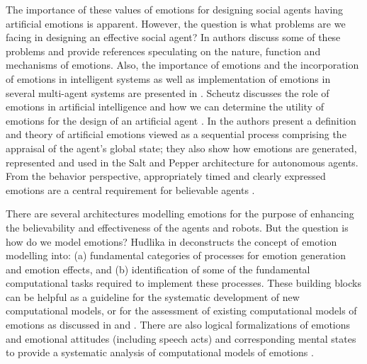 \documentclass[12pt]{report}
\begin{document}
The importance of these values of emotions for designing social agents having
artificial emotions is apparent. However, the question is what problems are we
facing in designing an effective social agent? In
\cite{freitas:artificial-emotions-ready} authors discuss some of these problems
and provide references speculating on the nature, function and mechanisms of
emotions. Also, the importance of emotions and the incorporation of emotions in
intelligent systems as well as implementation of emotions in several multi-agent
systems are presented in \cite{miranda:emotions-humans-ai}. Scheutz discusses
the role of emotions in artificial intelligence and how we can determine the
utility of emotions for the design of an artificial agent
\cite{scheutz:emotion-role}. In \cite{botelho:machinery-emotions} the authors
present a definition and theory of artificial emotions viewed as a sequential
process comprising the appraisal of the agent's global state; they also show how
emotions are generated, represented and used in the Salt and Pepper architecture
for autonomous agents. From the behavior perspective, appropriately timed and
clearly expressed emotions are a central requirement for believable agents
\cite{bates:emotion-roles}.

There are several architectures modelling emotions for the purpose of enhancing
the believability and effectiveness of the agents and robots. But the question
is how do we model emotions? Hudlika in \cite{hudlicka:modeling-emotion}
deconstructs the concept of emotion modelling into: (a) fundamental categories
of processes for emotion generation and emotion effects, and (b) identification
of some of the fundamental computational tasks required to implement these
processes. These building blocks can be helpful as a guideline for the
systematic development of new computational models, or for the assessment of
existing computational models of emotions as discussed in
\cite{lin:computational-models-emotion} and \cite{marsella:computational}. There
are also logical formalizations of emotions and emotional attitudes (including
speech acts) and corresponding mental states to provide a systematic analysis
of computational models of emotions \cite{adam:logical-formalization,
grant:model-intention-formation, guiraud:emotions-formalization-speech-acts}.
\end{document}
